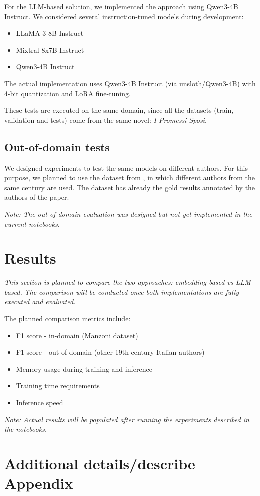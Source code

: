 \documentclass[11pt]{article}
\begin{document}
For the LLM-based solution, we implemented the approach using Qwen3-4B Instruct.
We considered several instruction-tuned models during development:

 \begin{itemize}
	\item LLaMA-3-8B Instruct
	\item Mixtral 8x7B Instruct
	\item Qwen3-4B Instruct
\end{itemize}

The actual implementation uses Qwen3-4B Instruct (via unsloth/Qwen3-4B) with 4-bit quantization and LoRA fine-tuning.

These tests are executed on the same domain, since all the datasets (train, validation and tests) 
come from the same novel: \emph{I Promessi Sposi}. 

\subsection{Out-of-domain tests}

We designed experiments to test the same models on different authors.
For this purpose, we planned to use the dataset from \cite{redaelli-sprugnoli-2024-sentence}, in which different authors
from the same century are used.
The dataset has already the gold results annotated by the authors of the paper.

\emph{Note: The out-of-domain evaluation was designed but not yet implemented in the current notebooks.}

\section{Results}

\emph{This section is planned to compare the two approaches: embedding-based vs LLM-based.}
\emph{The comparison will be conducted once both implementations are fully executed and evaluated.}

The planned comparison metrics include:

 \begin{itemize}
	\item F1 score - in-domain (Manzoni dataset)
	\item F1 score - out-of-domain (other 19th century Italian authors)
	\item Memory usage during training and inference
	\item Training time requirements
	\item Inference speed
 \end{itemize}

\emph{Note: Actual results will be populated after running the experiments described in the notebooks.}

\appendix
\section{Additional details/describe Appendix}
\label{sec:appendix1}


\end{document}
